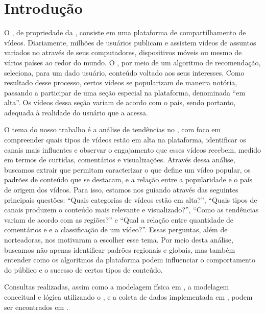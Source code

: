 
\chapter{Introdução}

  O  , de propriedade da , consiste em uma plataforma 
  de compartilhamento de vídeos. Diariamente, milhões de usuários publicam e assistem vídeos de assuntos
  variados no  através de seus computadores,
  dispositivos móveis ou mesmo  de vários países ao redor do mundo. O , por meio de um
  algoritmo de recomendação, seleciona, para um dado usuário, conteúdo voltado aos seus interesses. Como resultado desse processo,
  certos vídeos se popularizam de maneira notória, passando a participar de uma seção especial na plataforma, denominada
  ``em alta''.  Os vídeos dessa seção variam de acordo com o país, sendo portanto, adequada à realidade do usuário que a acessa.

  O tema do nosso trabalho é a análise de tendências no , com foco em compreender quais tipos de vídeos estão em alta na plataforma, identificar os canais mais influentes e observar o engajamento que esses vídeos recebem, medido em termos de curtidas, comentários e visualizações. Através dessa análise, buscamos extrair  que permitam caracterizar o que define um vídeo popular, os padrões de conteúdo que se destacam, e a relação entre a popularidade e o país de origem dos vídeos. Para isso, estamos nos guiando através das seguintes principais questões: ``Quais categorias de vídeos estão em alta?'', ``Quais tipos de canais produzem o conteúdo mais relevante e visualizado?'', ``Como as tendências variam de acordo com as regiões?'' e ``Qual a relação entre quantidade de comentários e  e a classificação de um vídeo?''. Essas perguntas, além de norteadoras, nos motivaram a escolher esse tema. Por meio desta análise, buscamos não apenas identificar padrões regionais e globais, mas também entender como os algoritmos da plataforma podem influenciar o comportamento do público e o sucesso de certos tipos de conteúdo.

  Consultas realizadas, assim como a modelagem física em , a modelagem conceitual e lógica utilizando
  o , e a coleta de dados implementada em , podem ser encontrados
  em \cite{our-YoutubeScraperDataBank}.


